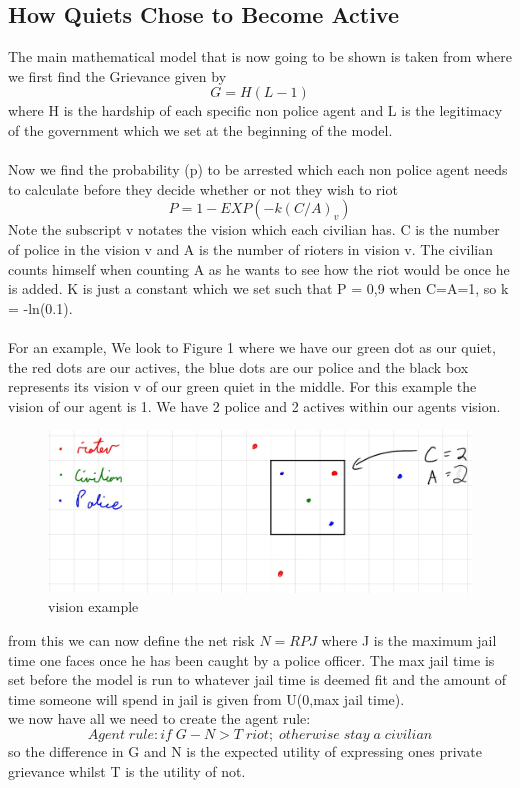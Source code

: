 \documentclass[11pt]{article}
\begin{document}
	\subsection*{How Quiets Chose to Become Active}
	The main mathematical model that is now going to be shown is taken from \citet{epstein2002modeling} where we first find the Grievance given by
	\begin{equation}
		G = H(L-1)
	\end{equation}
	where H is the hardship of each specific non police agent and L is the legitimacy of the government which we set at the beginning of the model. \\
	\\
	Now we find the probability (p) to be arrested which each non police agent needs to calculate before they decide whether or not they wish to riot
	\begin{equation}
		P = 1 - EXP(-k(C/A)_{v})
	\end{equation}
	Note the subscript v notates the vision which each civilian has. C is the number of police in the vision v and A is the number of rioters in vision v. The civilian counts himself when counting A as he wants to see how the riot would be once he is added. K is just a constant which we set such that P = 0,9 when C=A=1, so k = -ln(0.1). \\
	\\
	For an example, We look to Figure 1 where we have our green dot as our quiet, the red dots are our actives, the blue dots are our police and the black box represents its vision v of our green quiet in the middle. For this example the vision of our agent is 1. We have 2 police and 2 actives within our agents vision.\\
	\begin{figure}[H]
		\includegraphics[width=\linewidth]{vision example.png}
		\caption{vision example}
		\label{fig:boat1}
	\end{figure}
	
	from this we can now define the net risk $N = RPJ$ where J is the maximum jail time one faces once he has been caught by a police officer. The max jail time is set before the model is run to whatever jail time is deemed fit and the amount of time someone will spend in jail is given from U(0,max jail time).\\
	we now  have all we need to create the agent rule:\\
	\begin{equation}
		Agent \; rule: if \; G-N>T \; riot; \; otherwise \; stay \; a \;  civilian
	\end{equation}
	so the difference in G and N is the expected utility of expressing ones private grievance whilst T is the utility of not.
	
\end{document}
